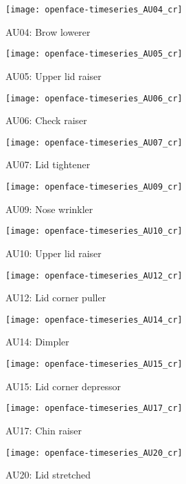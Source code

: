 \documentclass[a4paper,12pt]{article}
\begin{document}
\begin{figure}
\centering
\texttt{[image: openface-timeseries\_AU04\_cr]}
\caption{AU04: Brow lowerer}
\end{figure}

\begin{figure}
\centering
\texttt{[image: openface-timeseries\_AU05\_cr]}
\caption{AU05: Upper lid raiser}
\end{figure}


\begin{figure}
\centering
\texttt{[image: openface-timeseries\_AU06\_cr]}
\caption{AU06: Check raiser}
\end{figure}

\begin{figure}
\centering
\texttt{[image: openface-timeseries\_AU07\_cr]}
\caption{AU07: Lid tightener }
\end{figure}

\begin{figure}
\centering
\texttt{[image: openface-timeseries\_AU09\_cr]}
\caption{AU09: Nose wrinkler}
\end{figure}

\begin{figure}
\centering
\texttt{[image: openface-timeseries\_AU10\_cr]}
\caption{AU10: Upper lid raiser}
\end{figure}

\begin{figure}
\centering
\texttt{[image: openface-timeseries\_AU12\_cr]}
\caption{AU12: Lid corner puller}
\end{figure}


\begin{figure}
\centering
\texttt{[image: openface-timeseries\_AU14\_cr]}
\caption{AU14: Dimpler}
\end{figure}

\begin{figure}
\centering
\texttt{[image: openface-timeseries\_AU15\_cr]}
\caption{AU15: Lid corner depressor}
\end{figure}


\begin{figure}
\centering
\texttt{[image: openface-timeseries\_AU17\_cr]}
\caption{AU17: Chin raiser}
\end{figure}

\begin{figure}
\centering
\texttt{[image: openface-timeseries\_AU20\_cr]}
\caption{AU20: Lid stretched}
\end{figure}
\end{document}
